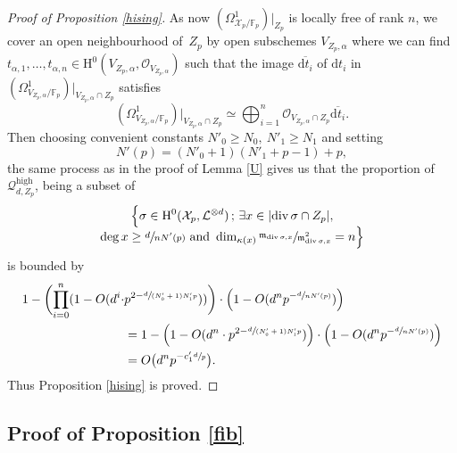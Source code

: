 \documentclass[11pt]{article}
\newcommand{\Subsection}{\subsection}
\numberwithin{equation}{section}
\newcommand{\sep}{\,;\,}
\theoremstyle{plain}
\theoremstyle{definition}
\newcommand{\ho}{\mathrm{H}}
\newcommand{\m}{\mathfrak{m}}
\newcommand{\X}{\mathcal{X}}
\newcommand{\li}{\mathcal{L}}
\newcommand{\F}{\mathbb{F}}
\begin{document}
\begin{proof}[Proof of Proposition \ref{hising}]
As now $(\Omega^1_{\X_p/\F_p})|_{Z_p}$ is locally free of rank $n$, we cover an open neighbourhood of~$Z_p$ by open subschemes $V_{Z_p,\alpha}$ where we can find $t_{\alpha,1},\dots,t_{\alpha,n}\in \ho^0(V_{Z_p,\alpha},\mathcal{O}_{V_{Z_p,\alpha}})$ such that the image $\overline{\mathrm{d}t_i}$ of ${\mathrm{d}t_i}$ in $(\Omega^1_{V_{Z_p,\alpha}/\F_p})\big|_{{V_{Z_p,\alpha}\cap Z_p}}$ satisfies\vspace*{-3pt}
\[
(\Omega^1_{V_{Z_p,\alpha}/\F_p})\big|_{V_{Z_p,\alpha}\cap Z_p}\simeq \bigoplus_{i=1}^n\mathcal{O}_{V_{Z_p,\alpha}\cap Z_p}\overline{\mathrm{d}t_i}.
\]
Then choosing convenient constants $N'_0\geq N_0,\ N'_1\geq N_1$ and setting\vspace*{-3pt}
\[
N'(p)=(N'_0+1)(N'_1+p-1)+p,
\]
the same process as in the proof of Lemma \ref{U} gives us that the proportion of $\mathcal{Q}_{d,Z_p}^{\mathrm{high}}$, being a subset of\vspace*{-3pt}
\begin{multline*}
\Bigl\{ \sigma\in \ho^0(\X_{p}, \li^{\otimes d})\sep \exists x\in |{\div\sigma\cap Z_p}|,\\[-5pt]
\deg x\geq \sfrac{d}{nN'(p)}\text{ and } \dim_{\kappa(x)}\sfrac{\m_{\div \sigma,x}}{\m^2_{\div \sigma, x}}=n \Bigr\}
\end{multline*}
is bounded by
\begin{align*}
1-\biggl(\prod_{i=0}^{n}(1-O(d^i\cdot& p^{2-\sfrac{d}{(N'_0+1)N'_1p}})) \biggr) \cdot \left(1-O(d^{n}p^{-\sfrac{d}{nN'(p)}}) \right) \\
&=1-\left(1-O(d^{n}\cdot p^{2-\sfrac{d}{(N'_0+1)N'_1p}})\right)\cdot \left(1-O(d^{n}p^{-\sfrac{d}{nN'(p)}}) \right) \\
&=O\bigl(d^{n}p^{-c'_1\sfrac{d}{p}} \bigr).
\end{align*}
Thus Proposition \ref{hising} is proved.
\end{proof}

\Subsection{Proof of Proposition \ref{fib}}\label{step4}
\end{document}
